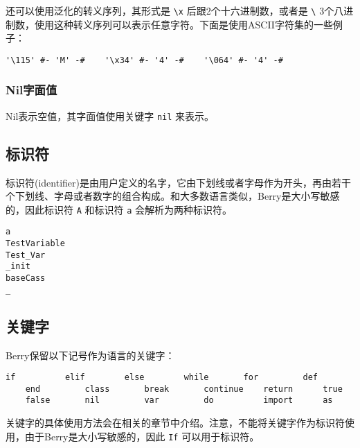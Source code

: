 还可以使用泛化的转义序列，其形式是 \texttt{\textbackslash x} 后跟2个十六进制数，或者是 \texttt{\textbackslash} 3个八进制数，使用这种转义序列可以表示任意字符。下面是使用ASCII字符集的一些例子：
\begin{lstlisting}[language=berry, numbers=none]
'\115' #- 'M' -#    '\x34' #- '4' -#    '\064' #- '4' -#
\end{lstlisting}

\subsubsection{Nil字面值}

Nil表示空值，其字面值使用关键字 \texttt{nil} 来表示。

\subsection{标识符} \label{section::identifier}

标识符(identifier)是由用户定义的名字，它由下划线或者字母作为开头，再由若干个下划线、字母或者数字的组合构成。和大多数语言类似，Berry是大小写敏感的，因此标识符 \texttt{A} 和标识符 \texttt{a} 会解析为两种标识符。
\begin{lstlisting}[language=berry, numbers=none]
a
TestVariable
Test_Var
_init
baseCass
_
\end{lstlisting}

\subsection{关键字}

Berry保留以下记号作为语言的关键字：
\begin{lstlisting}[language=berry, numbers=none]
    if          elif        else        while       for         def
    end         class       break       continue    return      true
    false       nil         var         do          import      as
\end{lstlisting}

关键字的具体使用方法会在相关的章节中介绍。注意，不能将关键字作为标识符使用，由于Berry是大小写敏感的，因此 \texttt{If} 可以用于标识符。
